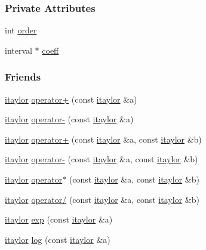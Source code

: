 \subsubsection*{\-Private \-Attributes}
\begin{DoxyCompactItemize}
\item 
int \hyperlink{classitaylor_a83c1b0a5a14fb5f0e0323adcc9b60a40}{order}
\item 
interval $\ast$ \hyperlink{classitaylor_a45521302408d376be9603aea42eb45f0}{coeff}
\end{DoxyCompactItemize}
\subsubsection*{\-Friends}
\begin{DoxyCompactItemize}
\item 
\hyperlink{classitaylor}{itaylor} \hyperlink{classitaylor_a812c741913a5c9a39d09244753c10f80}{operator+} (const \hyperlink{classitaylor}{itaylor} \&a)
\item 
\hyperlink{classitaylor}{itaylor} \hyperlink{classitaylor_a5650df7895792673fedd1d3bbb993ca4}{operator-\/} (const \hyperlink{classitaylor}{itaylor} \&a)
\item 
\hyperlink{classitaylor}{itaylor} \hyperlink{classitaylor_abff047f20e6e0c3b9619e87c5cd78d1e}{operator+} (const \hyperlink{classitaylor}{itaylor} \&a, const \hyperlink{classitaylor}{itaylor} \&b)
\item 
\hyperlink{classitaylor}{itaylor} \hyperlink{classitaylor_a819e619172b445480f82ae8fd3160fc0}{operator-\/} (const \hyperlink{classitaylor}{itaylor} \&a, const \hyperlink{classitaylor}{itaylor} \&b)
\item 
\hyperlink{classitaylor}{itaylor} \hyperlink{classitaylor_a57cb7c8e28bc6f9150c46a25942a90ba}{operator$\ast$} (const \hyperlink{classitaylor}{itaylor} \&a, const \hyperlink{classitaylor}{itaylor} \&b)
\item 
\hyperlink{classitaylor}{itaylor} \hyperlink{classitaylor_a1ba4cc5b5b0ddcf66d9f43f0be7f920d}{operator/} (const \hyperlink{classitaylor}{itaylor} \&a, const \hyperlink{classitaylor}{itaylor} \&b)
\item 
\hyperlink{classitaylor}{itaylor} \hyperlink{classitaylor_a39b9b1399538b2b8ed7055eb042a0481}{exp} (const \hyperlink{classitaylor}{itaylor} \&a)
\item 
\hyperlink{classitaylor}{itaylor} \hyperlink{classitaylor_aeeba35ade2a2342936eb6a1e493b5d53}{log} (const \hyperlink{classitaylor}{itaylor} \&a)
\item 

\end{DoxyCompactItemize}
